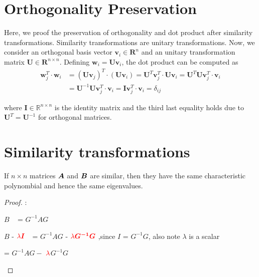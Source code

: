 \documentclass[a4paper]{article}
\begin{document}
\begin{appendix}
\section{Orthogonality Preservation}
Here, we proof the preservation of orthogonality and dot product after similarity transformations. Similarity transformations are unitary transformations. Now, we consider an orthogonal basis vector $\mathbf{v}_i\in\mathbf{R}^{n}$ and an unitary
transformation matrix $\mathbf{U}\in\mathbf{R}^{n\times n}$. Defining $\mathbf{w}_i=\mathbf{U}\mathbf{v}_i$, the dot product can
be computed as
\begin{align*}
	\mathbf{w}_j^T\cdot\mathbf{w}_i&=(\mathbf{U}\mathbf{v}_j)^T\cdot (\mathbf{U}\mathbf{v}_i)=\mathbf{U}^T\mathbf{v}_j^T\cdot \mathbf{U}\mathbf{v}_i=\mathbf{U}^T\mathbf{U}\mathbf{v}_j^T\cdot\mathbf{v}_i \\
&=\mathbf{U}^{-1}\mathbf{U}\mathbf{v}_j^T\cdot\mathbf{v}_i=\mathbf{I}\mathbf{v}_j^T\cdot\mathbf{v}_i=\delta_{ij}
\end{align*}


where $\mathbf{I}\in\mathbb{R}^{n\times n}$ is the identity matrix and the third last equality holds due to $\mathbf{U}^T=\mathbf{U}^{-1}$ for orthogonal matrices.

\section{Similarity transformations}

If $n\times n$ matrices $\mbox{\boldmath$A$}$ and $\mbox{\boldmath$B$}$ are similar, then they have the same characteristic polynombial and hence the same eigenvalues.

\label{sim_tran}
\begin{proof}:
\begin{adjustwidth}{20pt}{0pt}

\footnotesize


\mbox{\boldmath$B$}
\quad\quad\quad \,\,\,\,\,= \mbox{\boldmath$G^{-1}AG$} 

\mbox{\boldmath$B$} -
$\mathbin{\textcolor{red}{\lambda\mbox{\boldmath$I$} }}$
\,\,\,\,\quad = \mbox{\boldmath$G^{-1}AG$}  - $\mathbin{\textcolor{red}{\lambda\mbox{\boldmath$G^{-1}G$} }}$
,\quad\quad\quad\quad since \mbox{\boldmath$I$} = \mbox{\boldmath$G^{-1}G$}, also note $\lambda$ is a scalar

\quad\quad\quad\quad\quad  =
\mbox{\boldmath$G^{-1}AG -$}
$\mathbin{\textcolor{red}{\lambda}}$\mbox{\boldmath$G^{-1}G$}




\end{adjustwidth}
\end{proof}
\end{appendix}
\end{document}
